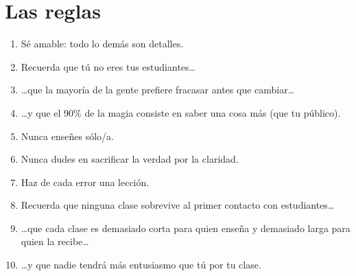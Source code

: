 \chapter*{Las reglas}

\begin{enumerate}

\item Sé amable: todo lo demás son detalles.\\

\item Recuerda que tú no eres tus estudiantes{\ldots}\\

\item {\ldots}que la mayoría de la gente prefiere fracasar antes que cambiar{\ldots}\\

\item {\ldots}y que el 90\% de la magia consiste en saber una cosa más (que tu público).\\

\item Nunca enseñes sólo/a.\\

\item Nunca dudes en sacrificar la verdad por la claridad.\\

\item Haz de cada error una lección.\\

\item Recuerda que ninguna clase sobrevive al primer contacto con estudiantes{\ldots}\\

\item {\ldots}que cada clase es demasiado corta para quien enseña y demasiado larga para quien la recibe{\ldots}\\

\item {\ldots}y que nadie tendrá más entusiasmo que tú por tu clase.

\end{enumerate}

